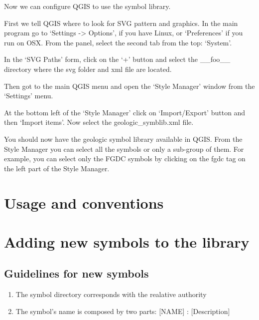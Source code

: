 \documentclass[letterpaper,10pt,english]{sphinxmanual}
\begin{document}
Now we can configure QGIS to use the symbol library.

First we tell QGIS where to look for SVG pattern and graphics.  In the main program go to ‘Settings -\textgreater{} Options’, if you have Linux, or ‘Preferences’ if you run on OSX.  From the panel, select the second tab from the top: ‘System’.

In the ‘SVG Paths’ form, click on the ‘+’ button and select the \_\_foo\_\_ directory where the svg folder  and xml file are located.

Then got to the main QGIS menu and open the ‘Style Manager’ window from the ‘Settings’ menu.

At the bottom left of the ‘Style Manager’ click on ‘Import/Export’ button and then ‘Import items’.  Now select the geologic\_symblib.xml file.

You should now have the geologic symbol library available in QGIS.  From the Style Manager you can select all the symbols or only a sub-group of them.  For example, you can select only the FGDC symbols by clicking on the fgdc tag on the left part of the Style Manager.


\chapter{Usage and conventions}
\label{\detokenize{usage:usage-and-conventions}}\label{\detokenize{usage::doc}}

\chapter{Adding new symbols to the library}
\label{\detokenize{developers_guide:adding-new-symbols-to-the-library}}\label{\detokenize{developers_guide::doc}}

\section{Guidelines for new symbols}
\label{\detokenize{developers_guide:guidelines-for-new-symbols}}\begin{enumerate}
\def\theenumi{\arabic{enumi}}
\def\labelenumi{\theenumi .}
\makeatletter\def\p@enumii{\p@enumi \theenumi .}\makeatother
\item {} 
The symbol directory corresponds with the realative authority

\item {} 
The symbol’s name is composed by two parts: {[}NAME{]} : {[}Description{]}

\end{enumerate}
\end{document}
